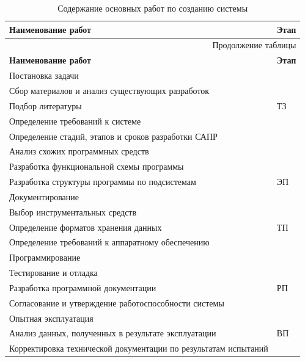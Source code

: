 \small
\begin{longtable}[h]{|p{}|p{}|}
  \caption{Содержание основных работ по созданию системы}
  \label{table:schedule}
  \\ \hline
	  \textbf{Наименование работ}   &
	  \textbf{Этап}
	\\ \hline
  \endfirsthead

  \multicolumn{2}{r}{Продолжение таблицы \thetable{}}
  \\ \hline
	  \textbf{Наименование работ}   &
	  \textbf{Этап}
	\\ \hline
  \endhead

  Постановка задачи                                                     &
  \\
  Сбор материалов и анализ существующих разработок                      &
  \\
  Подбор литературы                                                     & ТЗ
  \\
  Определение требований к системе                                      &
  \\
  Определение стадий, этапов и сроков разработки САПР                   &
  \\
  Анализ схожих программных средств                                     &
  \\ \hline

  Разработка функциональной схемы программы     &
  \\
  Разработка структуры программы по подсистемам & ЭП
  \\
  Документирование                              &
  \\ \hline

  Выбор инструментальных средств                             &
  \\
  Определение форматов хранения данных                       & ТП
  \\
  Определение требований к аппаратному обеспечению &
  \\ \hline

  Программирование                                     &
  \\
  Тестирование и отладка                               &
  \\
  Разработка программной документации                  & РП
  \\
  Согласование и утверждение работоспособности системы &
  \\
  Опытная эксплуатация                                 &
  \\ \hline

  Анализ данных, полученных в результате эксплуатации             & ВП
  \\
  Корректировка технической документации по результатам испытаний &
  \\ \hline
\end{longtable}
\normalsize



